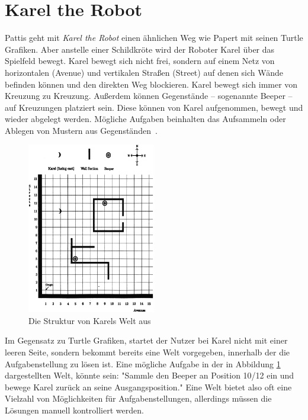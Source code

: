 \section{Karel the Robot}
\label{sec:related:karel}

Pattis geht mit \textit{Karel the Robot} einen ähnlichen Weg wie Papert mit seinen Turtle Grafiken. Aber anstelle einer Schildkröte wird der Roboter Karel über das Spielfeld bewegt. Karel bewegt sich nicht frei, sondern auf einem Netz von horizontalen (Avenue) und vertikalen Straßen (Street) auf denen sich Wände befinden können und den direkten Weg blockieren. Karel bewegt sich immer von Kreuzung zu Kreuzung. Außerdem können Gegenstände -- sogenannte Beeper -- auf Kreuzungen platziert sein. Diese können von Karel aufgenommen, bewegt und wieder abgelegt werden. Mögliche Aufgaben beinhalten das Aufsammeln oder Ablegen von Mustern aus Gegenständen~\cite[1-3]{pattis1981}.

\begin{figure}
    \centering
    \includegraphics[width=0.5\textwidth]{gfx/related-karel.png}
    \caption{Die Struktur von Karels Welt aus~\cite[3]{pattis1981}}
    \label{fig:related:karel}
\end{figure}

Im Gegensatz zu Turtle Grafiken, startet der Nutzer bei Karel nicht mit einer leeren Seite, sondern bekommt bereits eine Welt vorgegeben, innerhalb der die Aufgabenstellung zu lösen ist. Eine mögliche Aufgabe in der in Abbildung \ref{fig:related:karel} dargestellten Welt, könnte sein: "Sammle den Beeper an Position 10/12 ein und bewege Karel zurück an seine Ausgangsposition." Eine Welt bietet also oft eine Vielzahl von Möglichkeiten für Aufgabenstellungen, allerdings müssen die Lösungen manuell kontrolliert werden.


